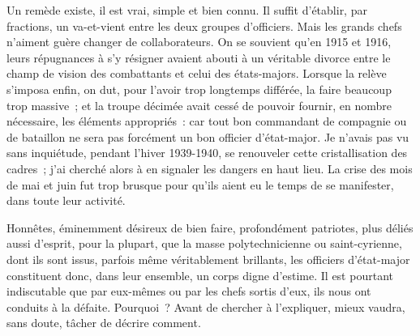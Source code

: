 \documentclass[french,twoside]{book} %
\begin{document}
Un remède existe, il est vrai, simple et bien connu. Il suffit d’établir, par fractions, un va-et-vient entre les deux groupes d’officiers. Mais les grands chefs n’aiment guère changer de collaborateurs. On se souvient qu’en 1915 et 1916, leurs répugnances à s’y résigner avaient abouti à un véritable divorce entre   le champ de vision des combattants et celui des états-majors. Lorsque la relève s’imposa enfin, on dut, pour l’avoir trop longtemps différée, la faire beaucoup trop massive ; et la troupe décimée avait cessé de pouvoir fournir, en nombre nécessaire, les éléments appropriés : car tout bon commandant de compagnie ou de bataillon ne sera pas forcément un bon officier d’état-major. Je n’avais pas vu sans inquiétude, pendant l’hiver 1939-1940, se renouveler cette cristallisation des cadres ; j’ai cherché alors à en signaler les dangers en haut lieu. La crise des mois de mai et juin fut trop brusque pour qu’ils aient eu le temps de se manifester, dans toute leur activité.\par
Honnêtes, éminemment désireux de bien faire, profondément patriotes, plus déliés aussi d’esprit, pour la plupart, que la masse polytechnicienne ou saint-cyrienne, dont ils sont issus, parfois même véritablement brillants, les officiers d’état-major constituent donc, dans leur ensemble, un corps digne d’estime. Il est pourtant indiscutable que par eux-mêmes ou par les chefs sortis d’eux, ils nous ont conduits à la défaite. Pourquoi ? Avant de chercher à l’expliquer, mieux vaudra, sans doute, tâcher de décrire comment.\par
\end{document}
